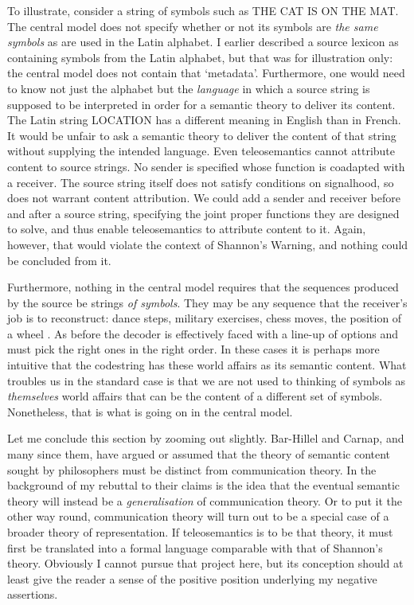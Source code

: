 To illustrate, consider a string of symbols such as {\sc THE CAT IS ON THE MAT}.
The central model does not specify whether or not its symbols are \textit{the same symbols} as are used in the Latin alphabet.
I earlier described a source lexicon as containing symbols from the Latin alphabet, but that was for illustration only: the central model does not contain that `metadata'.
Furthermore, one would need to know not just the alphabet but the \textit{language} in which a source string is supposed to be interpreted in order for a semantic theory to deliver its content.
The Latin string {\sc LOCATION} has a different meaning in English than in French.
It would be unfair to ask a semantic theory to deliver the content of that string without supplying the intended language.
Even teleosemantics cannot attribute content to source strings.
No sender is specified whose function is coadapted with a receiver.
The source string itself does not satisfy conditions on signalhood, so does not warrant content attribution.
We could add a sender and receiver before and after a source string, specifying the joint proper functions they are designed to solve, and thus enable teleosemantics to attribute content to it.
Again, however, that would violate the context of {\sc Shannon's Warning}, and nothing could be concluded from it.

Furthermore, nothing in the central model requires that the sequences produced by the source be strings \textit{of symbols}.
They may be any sequence that the receiver's job is to reconstruct: dance steps, military exercises, chess moves, the position of a wheel \citep[327]{shannon1959coding}.
As before the decoder is effectively faced with a line-up of options and must pick the right ones in the right order.
In these cases it is perhaps more intuitive that the codestring has these world affairs as its semantic content.
What troubles us in the standard case is that we are not used to thinking of symbols as \textit{themselves} world affairs that can be the content of a different set of symbols.
Nonetheless, that is what is going on in the central model.

Let me conclude this section by zooming out slightly.
Bar-Hillel and Carnap, and many since them, have argued or assumed that the theory of semantic content sought by philosophers must be distinct from communication theory.
In the background of my rebuttal to their claims is the idea that the eventual semantic theory will instead be a \textit{generalisation} of communication theory.
Or to put it the other way round, communication theory will turn out to be a special case of a broader theory of representation.
If teleosemantics is to be that theory, it must first be translated into a formal language comparable with that of Shannon's theory.
Obviously I cannot pursue that project here, but its conception should at least give the reader a sense of the positive position underlying my negative assertions.

